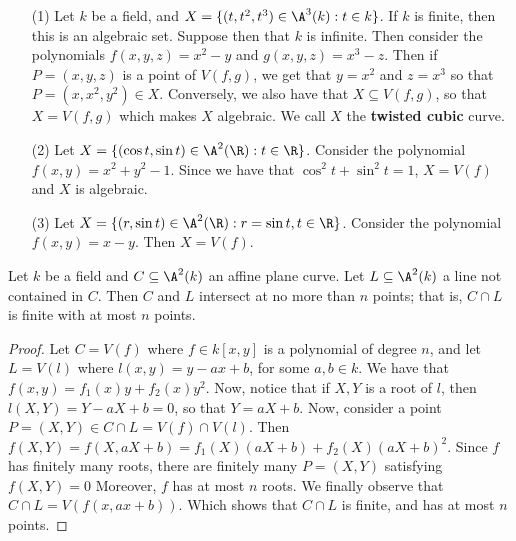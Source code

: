 \begin{example}\label{example_1.6}
    \begin{enumerate}

        \item[(1)] Let $k$ be a field, and  $X=\{(t,t^2,t^3) \in \A^3(k) : t \in
          k\}$. If $k$ is finite, then this is an algebraic set. Suppose then
          that  $k$ is infinite. Then consider the polynomials  $f(x,y,z)=x^2-y$
          and $g(x,y,z)=x^3-z$. Then if $P=(x,y,z)$ is a point of $V(f,g)$, we
          get that  $y=x^2$ and  $z=x^3$ so that  $P=(x,x^2,y^2) \in X$.
          Conversely, we also have that $X \subseteq V(f,g)$, so that $X=V(f,g)$
          which makes $X$ algebraic. We call $X$ the \textbf{twisted cubic}
          curve.

        \item[(2)] Let $X=\{(\cos{t},\sin{t}) \in \A^2(\R) : t \in \R\}$.
            Consider the polynomial $f(x,y)=x^2+y^2-1$. Since we have that
            $\cos^2{t}+\sin^2{t}=1$, $X=V(f)$ and $X$ is algebraic.

        \item[(3)] Let $X=\{(r,\sin{t}) \in \A^2(\R) : r=\sin{t}, t \in \R \}$.
            Consider the polynomial $f(x,y)=x-y$. Then $X=V(f)$.
    \end{enumerate}
\end{example}

\begin{proposition}\label{1.2.2}
    Let $k$ be a field and  $C \subseteq \A^2(k)$ an affine plane curve. Let $L
    \subseteq \A^2(k)$ a line not contained in $C$. Then $C$ and $L$ intersect
    at no more than $n$ points; that is, $C \cap L$ is finite
    with at most $n$ points.
\end{proposition}
\begin{proof}
    Let $C=V(f)$ where $f \in k[x,y]$ is a polynomial of degree $n$, and let
    $L=V(l)$ where $l(x,y)=y-ax+b$, for some $a,b \in k$. We have that
    $f(x,y)=f_1(x)y+f_2(x)y^2$. Now, notice that if $X,Y$ is a root of $l$, then
    $l(X,Y)=Y-aX+b=0$, so that $Y=aX+b$. Now, consider a point $P=(X,Y) \in C
    \cap L=V(f) \cap V(l)$. Then $f(X,Y)=f(X,aX+b)=f_1(X)(aX+b)+f_2(X)(aX+b)^2$.
    Since $f$ has finitely many roots, there are finitely many $P=(X,Y)$
    satisfying $f(X,Y)=0$ Moreover,  $f$ has at most $n$ roots. We finally
    observe that $C \cap L=V(f(x,ax+b))$. Which shows that $C \cap L$ is finite,
    and has at most $n$ points.
\end{proof}

